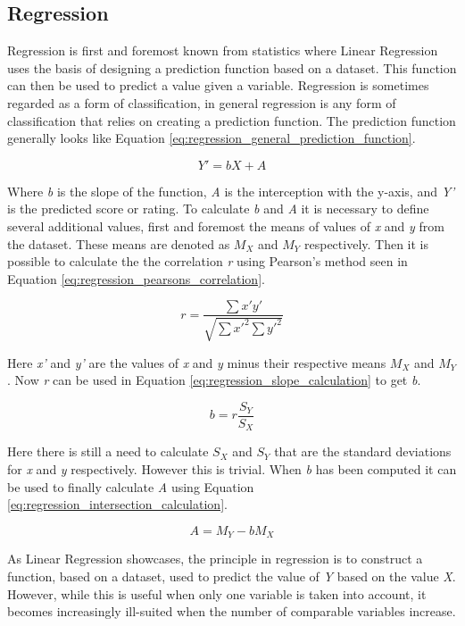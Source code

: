 \subsection{Regression} \label{bg:sub:regression}
Regression is first and foremost known from statistics where Linear Regression uses the basis of designing a prediction function based on a dataset. This function can then be used to predict a value given a variable. Regression is sometimes regarded as a form of classification, in general regression is any form of classification that relies on creating a prediction function.
The prediction function generally looks like Equation \ref{eq:regression_general_prediction_function}.

\begin{equation} \label{eq:regression_general_prediction_function}
	Y' = bX + A
\end{equation}

Where \textit{b} is the slope of the function, \textit{A} is the interception with the y-axis, and \textit{Y'} is the predicted score or rating.
To calculate \textit{b} and \textit{A} it is necessary to define several additional values, first and foremost the means of values of \textit{x} and \textit{y} from the dataset. These means are denoted as \textit{$M_{X}$} and \textit{$M_{Y}$} respectively. Then it is possible to calculate the the correlation \textit{r} using Pearson's method seen in Equation \ref{eq:regression_pearsons_correlation}.

\begin{equation} \label{eq:regression_pearsons_correlation}
	r = \frac{\sum x'y'}{\sqrt{\sum x'^{2}\sum y'^{2}}}
\end{equation}

Here \textit{x'} and \textit{y'} are the values of  \textit{x} and \textit{y} minus their respective means \textit{$M_{X}$} and \textit{$M_{Y}$}. Now \textit{r} can be used in Equation \ref{eq:regression_slope_calculation} to get \textit{b}.

\begin{equation} \label{eq:regression_slope_calculation}
	b = r\frac{S_{Y}}{S_{X}}
\end{equation}

Here there is still a need to calculate \textit{$S_{X}$} and \textit{$S_{Y}$} that are the standard deviations for \textit{x} and \textit{y} respectively. However this is trivial. When \textit{b} has been computed it can be used to finally calculate \textit{A} using Equation \ref{eq:regression_intersection_calculation}.

\begin{equation} \label{eq:regression_intersection_calculation}
	A = M_{Y} - bM_{X}
\end{equation}

As Linear Regression showcases, the principle in regression is to construct a function, based on a dataset, used to predict the value of \textit{Y} based on the value \textit{X}. However, while this is useful when only one variable is taken into account, it becomes increasingly ill-suited when the number of comparable variables increase.